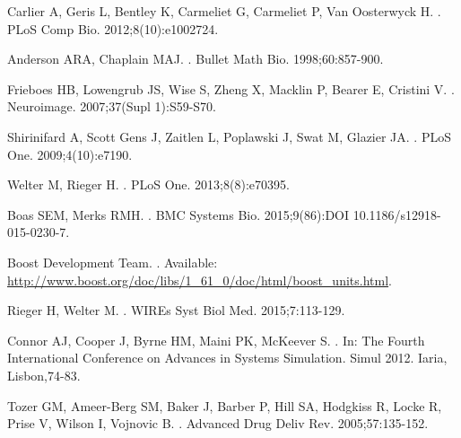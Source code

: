 \documentclass[10pt,letterpaper]{article}
\begin{document}
\begin{thebibliography}{10}
Carlier A, Geris L, Bentley K, Carmeliet G, Carmeliet P, Van Oosterwyck H.
.
\newblock PLoS Comp Bio. 2012;8(10):e1002724.

Anderson ARA, Chaplain MAJ.
.
\newblock Bullet Math Bio. 1998;60:857-900.

Frieboes HB, Lowengrub JS, Wise S, Zheng X, Macklin P, Bearer E, Cristini V.
.
\newblock Neuroimage. 2007;37(Supl 1):S59-S70.

Shirinifard A, Scott Gens J, Zaitlen L, Poplawski J, Swat M, Glazier JA.
.
\newblock PLoS One. 2009;4(10):e7190.

Welter M, Rieger H.
.
\newblock PLoS One. 2013;8(8):e70395.

Boas SEM, Merks RMH.
.
\newblock BMC Systems Bio. 2015;9(86):DOI 10.1186/s12918-015-0230-7.

Boost Development Team.
.
\newblock Available: \url{http://www.boost.org/doc/libs/1_61_0/doc/html/boost_units.html}.

Rieger H, Welter M.
.
\newblock WIREs Syst Biol Med. 2015;7:113-129.

Connor AJ, Cooper J, Byrne HM, Maini PK, McKeever S.
.
\newblock In: The Fourth International Conference on Advances in Systems Simulation. Simul 2012. Iaria, Lisbon,74-83.

Tozer GM, Ameer-Berg SM, Baker J, Barber P, Hill SA, Hodgkiss R, Locke R, Prise V, Wilson I, Vojnovic B.
.
\newblock Advanced Drug Deliv Rev. 2005;57:135-152.


\end{thebibliography}
\end{document}
